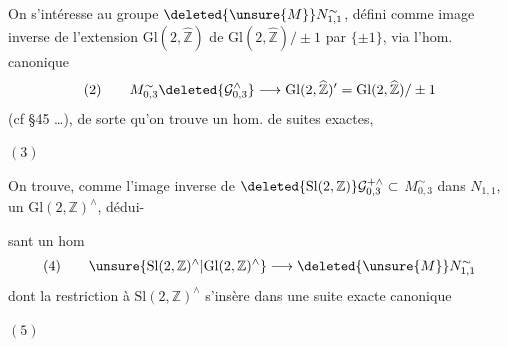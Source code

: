 On s'intéresse au groupe $\deleted{\unsure{M}}N_{1,1}^{\sim}$, défini  comme image inverse de l'extension $\mathrm{Gl}(2,\widehat{\mathbb Z})$ de $\mathrm{Gl}(2,\widehat{\mathbb Z})/\pm1$ par $\{\pm1\}$, via l'hom. canonique
\[
(2)\qquad
M_{0,3}^{\sim}\deleted{\mathcal G_{0,3}^{\wedge}}
\longrightarrow\mathrm{Gl}(2,\widehat{\mathbb Z})'
=\mathrm{Gl}(2,\widehat{\mathbb Z})/\pm1
\]
(cf \S45 \ldots), de sorte qu'on trouve un hom. de suites exactes,


\begin{samepage}
$(3)$
\end{samepage}

On trouve,   comme l'image inverse de $\deleted{\mathrm{Sl}(2,\mathbb Z)}\mathcal G_{0,3}^{+\wedge}\subset$  $M_{0,3}^{\sim}$ dans $N_{1,1}$, un $\mathrm{Gl}(2,\mathbb Z)^\wedge$, dédui-



sant un hom
\[
(4)\qquad
\unsure{\mathrm{Sl}(2,\mathbb Z)^\wedge|\mathrm{Gl}(2,\mathbb Z)^\wedge}
\longrightarrow\deleted{\unsure{M}}N_{1,1}^{\sim}
\]
dont la restriction à $\mathrm{Sl}(2,\mathbb Z)^\wedge$ s'insère  dans une suite exacte canonique

\begin{samepage}
$(5)$
\end{samepage}


